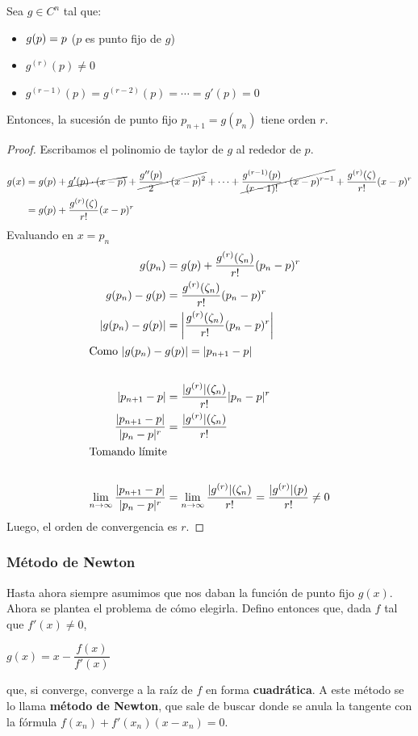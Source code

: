 \documentclass[]{article}
\begin{document}
\begin{prop}
	Sea $g\in C^n$ tal que:
	\begin{itemize}
		\item $g(p) = p \hfill$ ($p$ es punto fijo de $g$)
		\item $g^{(r)}(p)\neq0$
		\item $g^{(r-1)}(p) = g^{(r-2)}(p) =\cdots= g'(p) = 0$
	\end{itemize}

	Entonces, la sucesión de punto fijo $p_{n+1} = g(p_n)$ tiene orden $r$.
	\begin{proof}
		Escribamos el polinomio de taylor de $g$ al rededor de $p$.

		\begin{align*}
			g(x) &= g(p) + \cancel{g'(p)\cdot(x-p)} + \cancel{\dfrac{g''(p)}{2}\cdot (x-p)^2} + \cdots + \cancel{\dfrac{g^{(r-1)}(p)}{(r-1)!}\cdot(x-p)^{r-1}} + \dfrac{g^{(r)}(\zeta)}{r!}(x-p)^r\\
			&= g(p) + \dfrac{g^{(r)}(\zeta)}{r!}(x-p)^r\\
		\end{align*}
Evaluando en $x=p_n$
		\begin{align*}
			g(p_n) &= g(p) + \dfrac{g^{(r)}(\zeta_n)}{r!}(p_n-p)^r\\
			g(p_n) - g(p) &= \dfrac{g^{(r)}(\zeta_n)}{r!}(p_n-p)^r\\
			|g(p_n) - g(p)| &= \left|\dfrac{g^{(r)}(\zeta_n)}{r!}(p_n-p)^r\right|\\
			\intertext{Como $|g(p_n) - g(p)| = |p_{n+1} - p|$}\\
			|p_{n+1} - p| &= \dfrac{|g^{(r)}|(\zeta_n)}{r!}|p_n-p|^r\\
			\dfrac{|p_{n+1} - p|}{|p_n-p|^r} &= \dfrac{|g^{(r)}|(\zeta_n)}{r!}\\
			\intertext{Tomando límite}\\
			\lim_{n\to\infty} \dfrac{|p_{n+1} - p|}{|p_n-p|^r} &= \lim_{n\to\infty}\dfrac{|g^{(r)}|(\zeta_n)}{r!} = \dfrac{|g^{(r)}|(p)}{r!} \neq0\\
		\end{align*}
		Luego, el orden de convergencia es $r$.
	\end{proof}
\end{prop}


\subsubsection{Método de Newton}
Hasta ahora siempre asumimos que nos daban la función de punto fijo $g(x)$. Ahora se plantea el problema de cómo elegirla. Defino entonces que, dada $f$ tal que $f'(x)\neq0$,
\begin{center}
	$g(x) = x-\dfrac{f(x)}{f'(x)}$
\end{center}
que, si converge, converge a la raíz de $f$ en forma \textbf{cuadrática}. A este método se lo llama \textbf{método de Newton}, que sale de buscar donde se anula la tangente con la fórmula $f(x_n) + f'(x_n)(x-x_n)=0$.
\end{document}
